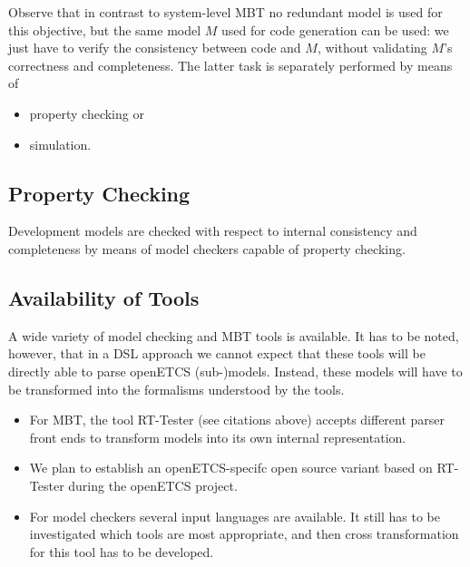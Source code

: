\documentclass[11pt, a4paper]{article}
\begin{document}
Observe that in contrast to system-level MBT no redundant model is used for this objective, but the
same model $M$ used for code generation can be used: we just have to verify the consistency between 
code and $M$, without validating $M$'s correctness and completeness. The latter task is separately performed
by means of 
\begin{itemize}
\item property checking or
\item simulation.
\end{itemize}


\subsection{Property Checking}

Development models are checked with respect to internal consistency and completeness 
by means of model checkers capable of property checking. 


\subsection{Availability of Tools}

A wide variety of model checking and MBT tools is available.
It has to be noted, however, that in a DSL approach we cannot expect that
these tools will be directly able to parse openETCS (sub-)models. Instead, these models
will have to be transformed into the formalisms understood by the tools.

\begin{itemize}
\item For MBT, the tool RT-Tester (see citations above) accepts different parser front ends 
to transform models into its own internal representation.
\item We plan to establish an openETCS-specifc open source variant based on RT-Tester during the openETCS project.

\item For model checkers several input languages are available. It still has to be investigated which tools are most appropriate, and then cross transformation for this tool has to be developed.
\end{itemize}
\end{document}
